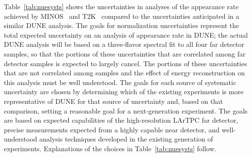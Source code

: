 Table~\ref{tab:nuesysts} shows the uncertainties in
analyses of the \nue appearance rate achieved by MINOS~\cite{Adamson:2013ue}
and T2K~\cite{Abe:2015awa} compared to the uncertainties anticipated in a similar DUNE analysis.
The goals for normalization uncertainties represent the total expected uncertainty on
an analysis of \nue appearance rate in DUNE; the actual DUNE analysis will be based on
a three-flavor spectral fit to all four far detector samples, so that the portions of these
uncertainties that are correlated among far detector samples is expected to largely
cancel. The portions of these uncertainties that are not correlated among samples and
the effect of energy reconstruction on this analysis must be well understood.
The goals for each source of systematic uncertainty are chosen by determining which
of the existing experiments is more representative of DUNE for that source
of uncertainty and, based on that comparison, setting a reasonable goal for a next-generation
experiment. The goals are based on expected capabilities of the high-resolution
LArTPC far detector, precise measurements expected from a highly capable near detector,
and well-understood analysis techniques developed in the existing generation of experiments.
Explanations of the choices in Table~\ref{tab:nuesysts} follow.
%
